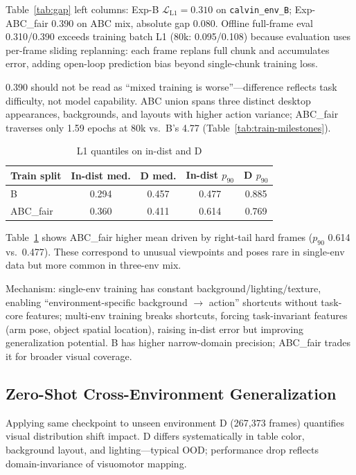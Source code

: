 \documentclass[10pt,twocolumn,letterpaper]{article}
\newcommand{\tabref}[1]{Table~\ref{#1}}
\begin{document}
\tabref{tab:gap} left columns: Exp-B $\mathcal{L}_{\mathrm{L1}}{=}0.310$ on \texttt{calvin\_env\_B}; Exp-ABC\_fair 0.390 on ABC mix, absolute gap 0.080. Offline full-frame eval 0.310/0.390 exceeds training batch L1 (80k: 0.095/0.108) because evaluation uses per-frame sliding replanning: each frame replans full chunk and accumulates error, adding open-loop prediction bias beyond single-chunk training loss.

0.390 should not be read as ``mixed training is worse''---difference reflects task difficulty, not model capability. ABC union spans three distinct desktop appearances, backgrounds, and layouts with higher action variance; ABC\_fair traverses only 1.59 epochs at 80k vs.\ B's 4.77 (\tabref{tab:train-milestones}).

\begin{table}[H]
  \centering
  \caption{L1 quantiles on in-dist and D}
  \label{tab:quantile}
  \footnotesize
  \begin{tabular}{@{}lcccc@{}}
    \toprule
    Train split & In-dist med. & D med. & In-dist $p_{90}$ & D $p_{90}$ \\
    \midrule
    B & 0.294 & 0.457 & 0.477 & 0.885 \\
    ABC\_fair & 0.360 & 0.411 & 0.614 & 0.769 \\
    \bottomrule
  \end{tabular}
\end{table}

\tabref{tab:quantile} shows ABC\_fair higher mean driven by right-tail hard frames ($p_{90}$ 0.614 vs.\ 0.477). These correspond to unusual viewpoints and poses rare in single-env data but more common in three-env mix.

Mechanism: single-env training has constant background/lighting/texture, enabling ``environment-specific background $\to$ action'' shortcuts without task-core features; multi-env training breaks shortcuts, forcing task-invariant features (arm pose, object spatial location), raising in-dist error but improving generalization potential. B has higher narrow-domain precision; ABC\_fair trades it for broader visual coverage.

\subsection{Zero-Shot Cross-Environment Generalization}

Applying same checkpoint to unseen environment D (267{,}373 frames) quantifies visual distribution shift impact. D differs systematically in table color, background layout, and lighting---typical OOD; performance drop reflects domain-invariance of visuomotor mapping.
\end{document}
